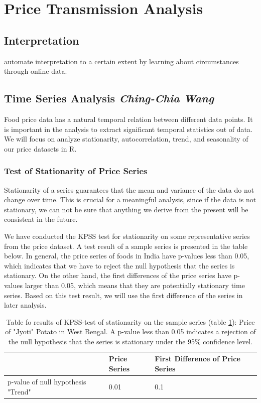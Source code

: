 \section*{Price Transmission Analysis}

\subsection*{Interpretation}
automate interpretation to a certain extent by learning about circumstances through online data.

\subsection*{Time Series Analysis \footnotesize\textit{Ching-Chia Wang}}
Food price data has a natural temporal relation between different data points. It is important in the analysis to extract significant temporal statistics out of data. We will focus on analyze stationarity, autocorrelation, trend, and seasonality of our price datasets in R.

\subsubsection*{Test of Stationarity of Price Series}
Stationarity of a series guarantees that the mean and variance of the data do not change over time. This is crucial for a meaningful analysis, since if the data is not stationary, we can not be sure that anything we derive from the present will be consistent in the future.

We have conducted the KPSS test for stationarity on some representative series from the price dataset. A test result of a sample series is presented in the table below. In general, the price series of foods in India have p-values less than 0.05, which indicates that we have to reject the null hypothesis that the series is stationary. On the other hand, the first differences of the price series have p-values larger than 0.05, which means that they are potentially stationary time series. Based on this test result, we will use the first difference of the series in later analysis.

\begin{table}[h]
\begin{tabular}{|l|l|l|}
\hline
\hspace{5pt} & Price Series & First Difference of Price Series \\ \hline
p-value of null hypothesis "Trend" & 0.01 & 0.1\\ \hline
\end{tabular}
\label{table:kpss}
\caption{Table fo results of KPSS-test of stationarity on the sample series (table \ref{table:kpss}): Price of "Jyoti" Potato in West Bengal. A p-value less than 0.05 indicates a rejection of the null hypothesis that the series is stationary under the 95\% confidence level.}
\end{table}

